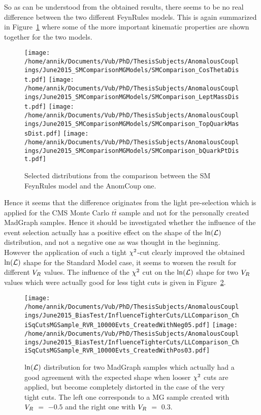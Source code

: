 So as can be understood from the obtained results, there seems to be no real difference between the two different FeynRules models. This is again summarized in Figure~\ref{fig::FRModelComp} where some of the more important kinematic properties are shown together for the two models.
\begin{figure}[h!t]
 \centering
 \texttt{[image: /home/annik/Documents/Vub/PhD/ThesisSubjects/AnomalousCouplings/June2015\_SMComparisonMGModels/SMComparison\_CosThetaDist.pdf]}
 \texttt{[image: /home/annik/Documents/Vub/PhD/ThesisSubjects/AnomalousCouplings/June2015\_SMComparisonMGModels/SMComparison\_LeptMassDist.pdf]}
 \texttt{[image: /home/annik/Documents/Vub/PhD/ThesisSubjects/AnomalousCouplings/June2015\_SMComparisonMGModels/SMComparison\_TopQuarkMassDist.pdf]}
 \texttt{[image: /home/annik/Documents/Vub/PhD/ThesisSubjects/AnomalousCouplings/June2015\_SMComparisonMGModels/SMComparison\_bQuarkPtDist.pdf]} 
 \caption{Selected distributions from the comparison between the SM FeynRules model and the AnomCoup one.}
 \label{fig::FRModelComp}
\end{figure}

Hence it seems that the difference originates from the light pre-selection which is applied for the CMS Monte Carlo $t\bar{t}$ sample and not for the personally created MadGraph samples. Hence it should be investigated whether the influence of the event selection actually has a positive effect on the shape of the $\ln(\mathcal{L})$ distribution, and not a negative one as was thought in the beginning.
\\

However the application of such a tight $\chi^{2}$-cut clearly improved the obtained $\ln(\mathcal{L})$ shape for the Standard Model case, it seems to worsen the result for different $V_{R}$ values.
The influence of the $\chi^{2}$ cut on the $\ln(\mathcal{L})$ shape for two $V_{R}$ values which were actually good for less tight cuts is given in Figure~\ref{fig::BadLLTight}.
\begin{figure}[h!t]
 \centering
 \texttt{[image: /home/annik/Documents/Vub/PhD/ThesisSubjects/AnomalousCouplings/June2015\_BiasTest/InfluenceTighterCuts/LLComparison\_ChiSqCutsMGSample\_RVR\_10000Evts\_CreatedWithNeg05.pdf]}
 \texttt{[image: /home/annik/Documents/Vub/PhD/ThesisSubjects/AnomalousCouplings/June2015\_BiasTest/InfluenceTighterCuts/LLComparison\_ChiSqCutsMGSample\_RVR\_10000Evts\_CreatedWithPos03.pdf]}
 \caption{$\ln(\mathcal{L})$ distribution for two MadGraph samples which actually had a good agreement with the expected shape when looser $\chi^{2}$ cuts are applied, but become completely distorted in the case of the very tight cuts. The left one corresponds to a MG sample created with $V_{R}$ $=$ $-0.5$ and the right one with $V_{R}$ $=$ $0.3$.}
 \label{fig::BadLLTight}
\end{figure}

